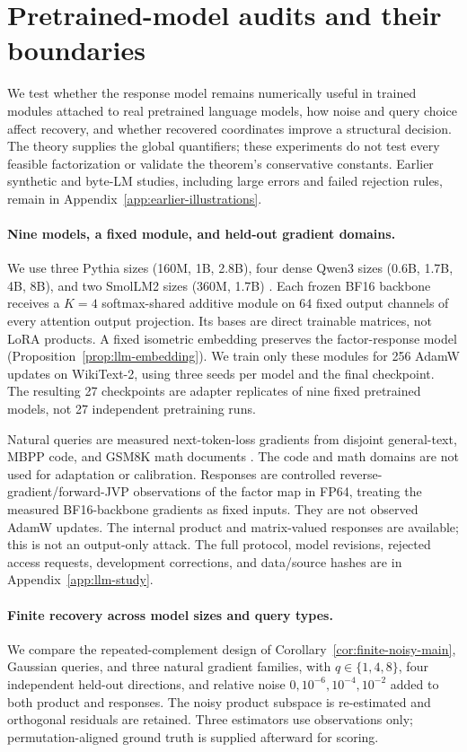 \section{Pretrained-model audits and their boundaries}
\label{sec:experiments}

We test whether the response model remains numerically useful in trained
modules attached to real pretrained language models, how noise and query
choice affect recovery, and whether recovered coordinates improve a
structural decision. The theory supplies the global quantifiers; these
experiments do not test every feasible factorization or validate the
theorem's conservative constants. Earlier synthetic and byte-LM studies,
including large errors and failed rejection rules, remain in
Appendix~\ref{app:earlier-illustrations}.

\paragraph{Nine models, a fixed module, and held-out gradient domains.}
We use three Pythia sizes (160M, 1B, 2.8B), four dense Qwen3 sizes
(0.6B, 1.7B, 4B, 8B), and two SmolLM2 sizes (360M, 1.7B)
\citep{biderman2023pythia,yang2025qwen3,allal2025smollm2}.
Each frozen BF16 backbone receives a $K=4$ softmax-shared additive module
on 64 fixed output channels of every attention output projection. Its bases
are direct trainable matrices, not LoRA products. A fixed isometric
embedding preserves the factor-response model
(Proposition~\ref{prop:llm-embedding}). We train only these modules for
256 AdamW updates on WikiText-2, using three seeds per model and the final
checkpoint. The resulting 27 checkpoints are adapter replicates of nine
fixed pretrained models, not 27 independent pretraining runs.

Natural queries are measured next-token-loss gradients from disjoint
 general-text, MBPP code, and GSM8K math documents
\citep{merity2016wikitext,austin2021mbpp,cobbe2021gsm8k}.
The code and math domains are not used for adaptation or calibration.
Responses are controlled reverse-gradient/forward-JVP observations of the
factor map in FP64, treating the measured BF16-backbone gradients as fixed
inputs. They are not observed AdamW updates. The internal product and
matrix-valued responses are available; this is not an output-only attack.
The full protocol, model revisions, rejected access requests, development
corrections, and data/source hashes are in Appendix~\ref{app:llm-study}.

\paragraph{Finite recovery across model sizes and query types.}
We compare the repeated-complement design of
Corollary~\ref{cor:finite-noisy-main}, Gaussian queries, and three natural
 gradient families, with $q\in\{1,4,8\}$, four independent held-out
 directions, and relative noise $0,10^{-6},10^{-4},10^{-2}$ added to both
product and responses. The noisy product subspace is re-estimated and
orthogonal residuals are retained. Three estimators use observations only;
permutation-aligned ground truth is supplied afterward for scoring.

